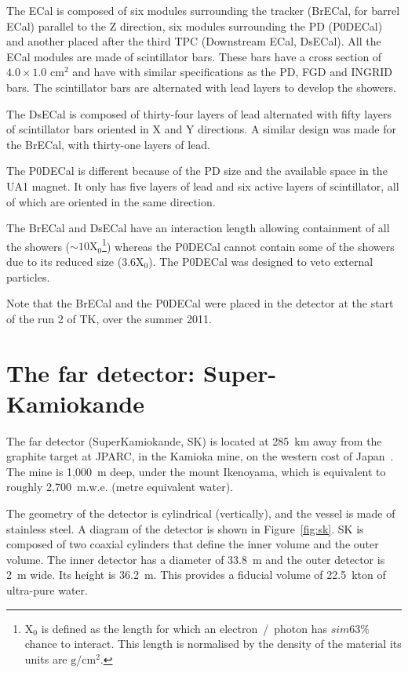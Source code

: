 The \Gls{ECal} is composed of six modules surrounding the tracker
(\Gls{BrECal}, for barrel \Gls{ECal}) parallel to the Z direction, six
modules surrounding the \Gls{PD} (\Gls{P0DECal}) and another placed
after the third \Gls{TPC} (Downstream \Gls{ECal}, \Gls{DsECal}).  All
the \Gls{ECal} modules are made of scintillator bars. These bars have
a cross section of $4.0 \times 1.0 \text{~cm}^2$ and have with similar
specifications as the \Gls{PD}, \Gls{FGD} and \Gls{INGRID} bars. The
scintillator bars are alternated with lead layers to develop the
showers.

The \Gls{DsECal} is composed of thirty-four layers of lead alternated
with fifty layers of scintillator bars oriented in X and Y
directions. A similar design was made for the \Gls{BrECal}, with
thirty-one layers of lead.

The \Gls{P0DECal} is different because of the \Gls{PD} size and the
available space in the UA1 magnet. It only has five layers of lead and
six active layers of scintillator, all of which are oriented in the
same direction.

The \Gls{BrECal} and \Gls{DsECal} have an interaction length allowing
containment of all the showers
($\sim 10\text{X}_0$\footnote{$\text{X}_0$ is defined as the length
  for which an electron~/~photon has $sim 63\%$ chance to
  interact. This length is normalised by the density of the material
  its units are $\text{g} / \text{cm}^2$.}) whereas the \Gls{P0DECal}
cannot contain some of the showers due to its reduced size
($3.6 \text{X}_0$). The \Gls{P0DECal} was designed to veto external
particles.

Note that the \Gls{BrECal} and the \Gls{P0DECal} were placed in the
detector at the start of the run 2 of \Gls{TK}, over the summer 2011.


\section{The far detector: Super-Kamiokande}
\label{sec:sk}
The far detector (SuperKamiokande, \Gls{SK}) is located at 285~km away
from the graphite target at \Gls{JPARC}, in the Kamioka mine, on the
western cost of Japan~\cite{SK2003}. The mine is 1,000~m deep, under
the mount Ikenoyama, which is equivalent to roughly
2,700~m.w.e. (metre equivalent water).

The geometry of the detector is cylindrical (vertically), and the
vessel is made of stainless steel. A diagram of the detector is shown
in Figure~\ref{fig:sk}.  \Gls{SK} is composed of two coaxial cylinders
that define the inner volume and the outer volume. The inner detector
has a diameter of 33.8~m and the outer detector is 2~m wide. Its
height is 36.2~m. This provides a fiducial volume of 22.5~kton of
ultra-pure water.

